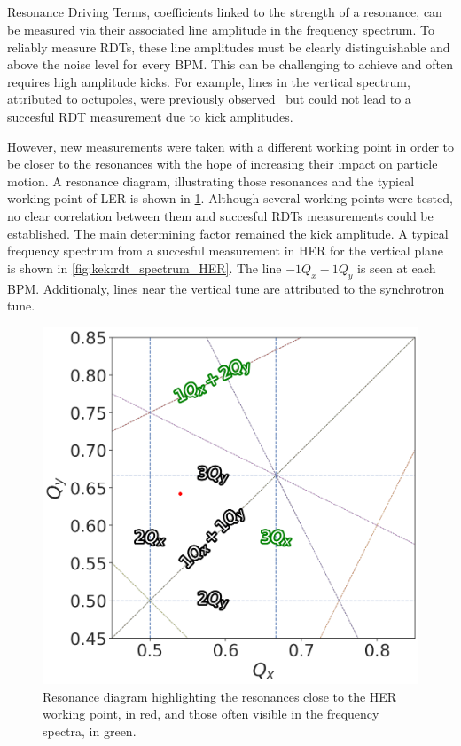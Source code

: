 \FloatBarrier
\subsection{}

Resonance Driving Terms, coefficients linked to the strength of a resonance, can be measured via
their associated line amplitude in the frequency spectrum. To reliably measure RDTs, these
line amplitudes must be clearly distinguishable and above the noise level for every BPM. This can be
challenging to achieve and often requires high amplitude kicks.
For example, lines in the vertical spectrum, attributed to octupoles, were previously
observed~\cite{keintzel_jacqueline_beam_2022} but could not lead to a succesful RDT measurement due
to kick amplitudes.

However, new measurements were taken with a different working point in order to be closer to the 
resonances with the hope of increasing their impact on particle motion. A resonance diagram,
illustrating those resonances and the typical working point of LER is shown in
\cref{fig:kek:tune_diagram}. Although several working points were tested, no clear correlation
between them and succesful RDTs measurements could be established. The main determining factor
remained the kick amplitude. A typical frequency spectrum from a succesful measurement in HER for
the vertical plane is shown in \cref{fig:kek:rdt_spectrum_HER}. The line $-1Q_x - 1Q_y$ is seen at
each BPM. Additionaly, lines near the vertical tune are attributed to the synchrotron tune.

\begin{figure}[!htb]
    \centering
    \includegraphics[width=0.6\linewidth]{images/kek/tune_diagram.png}
    \caption{Resonance diagram highlighting the resonances close to the HER working point, in red, 
    and those often visible in the frequency spectra, in green.}
    \label{fig:kek:tune_diagram}
\end{figure}

